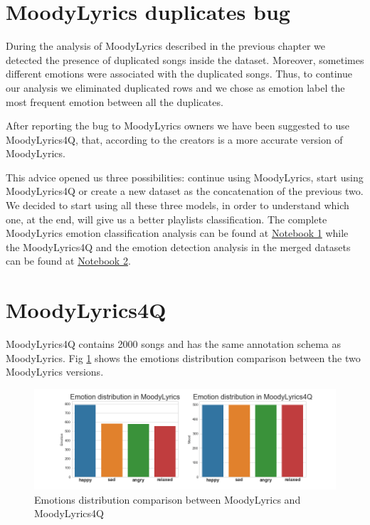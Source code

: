 \section{MoodyLyrics duplicates bug}
During the analysis of MoodyLyrics described in the previous chapter we detected the presence of duplicated songs inside the dataset. Moreover, sometimes different emotions were associated with the duplicated songs. Thus, to continue our analysis we eliminated duplicated rows and we chose as emotion label the most frequent emotion between all the duplicates.\par
After reporting the bug to MoodyLyrics owners we have been suggested to use MoodyLyrics4Q, that, according to the creators is a more accurate version of MoodyLyrics.\par
This advice opened us three possibilities: continue using MoodyLyrics, start using MoodyLyrics4Q or create a new dataset as the concatenation of the previous two. We decided to start using all these three models, in order to understand which one, at the end, will give us a better playlists classification. The complete MoodyLyrics emotion classification analysis can be found at \href{https://github.com/sgiammy/emotion-patterns-in-music-playlists/blob/master/Notebook/1_ED_in_songs_lyrics.ipynb}{Notebook 1} while the MoodyLyrics4Q and the emotion detection analysis in the merged datasets can be found at \href{https://github.com/sgiammy/emotion-patterns-in-music-playlists/blob/master/Notebook/2_Advanced_Feature_Engineering.ipynb}{Notebook 2}.


\section{MoodyLyrics4Q}
MoodyLyrics4Q contains 2000 songs and has the same annotation schema as MoodyLyrics. Fig \ref{fig:stats}
shows the emotions distribution comparison between the two MoodyLyrics versions.

\begin{figure}[H]
\centering
\includegraphics[width=1.1\textwidth]{./chapters/chapter5/images/Stats.png}
\caption{Emotions distribution comparison between MoodyLyrics and MoodyLyrics4Q}
\label{fig:stats}
\end{figure}

